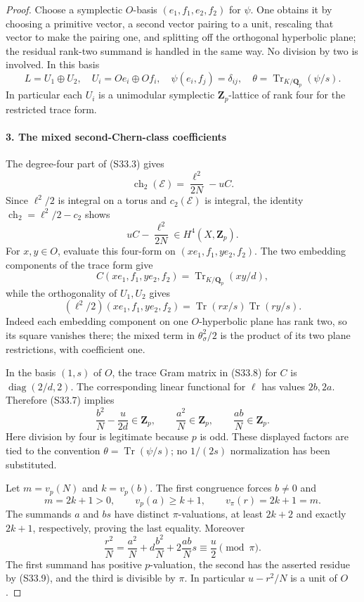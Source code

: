 \begin{proof}
Choose a symplectic \(O\)-basis \((e_1,f_1,e_2,f_2)\) for \(\psi\). One obtains it by choosing a primitive vector, a second vector pairing to a unit, rescaling that vector to make the pairing one, and splitting off the orthogonal hyperbolic plane; the residual rank-two summand is handled in the same way. No division by two is involved. In this basis \[
 L=U_1\oplus U_2,
 \quad U_i=Oe_i\oplus Of_i,
 \quad \psi(e_i,f_j)=\delta_{ij},
 \quad \theta=\operatorname{Tr}_{K/\mathbf Q_p}(\psi/s).
 \tag{S33.6}
\] In particular each \(U_i\) is a unimodular symplectic \(\mathbf Z_p\)-lattice of rank four for the restricted trace form.

\paragraph{3. The mixed second-Chern-class coefficients}

The degree-four part of (S33.3) gives \[
 \operatorname{ch}_2(\mathcal E)=\frac{\ell^2}{2N}-uC.
\] Since \(\ell^2/2\) is integral on a torus and \(c_2(\mathcal E)\) is integral, the identity \(\operatorname{ch}_2=\ell^2/2-c_2\) shows \[
 uC-\frac{\ell^2}{2N}\in H^4(X,\mathbf Z_p).
 \tag{S33.7}
\] For \(x,y\in O\), evaluate this four-form on \((xe_1,f_1,ye_2,f_2)\). The two embedding components of the trace form give \[
 C(xe_1,f_1,ye_2,f_2)=\operatorname{Tr}_{K/\mathbf Q_p}(xy/d),
\] while the orthogonality of \(U_1,U_2\) gives \[
 (\ell^2/2)(xe_1,f_1,ye_2,f_2)
 =\operatorname{Tr}(rx/s)\operatorname{Tr}(ry/s).
 \tag{S33.8}
\] Indeed each embedding component on one \(O\)-hyperbolic plane has rank two, so its square vanishes there; the mixed term in \(\theta_\sigma^2/2\) is the product of its two plane restrictions, with coefficient one.

In the basis \((1,s)\) of \(O\), the trace Gram matrix in (S33.8) for \(C\) is \(\operatorname{diag}(2/d,2)\). The corresponding linear functional for \(\ell\) has values \(2b,2a\). Therefore (S33.7) implies \[
 \frac{b^2}{N}-\frac{u}{2d}\in\mathbf Z_p,
 \qquad \frac{a^2}{N}\in\mathbf Z_p,
 \qquad \frac{ab}{N}\in\mathbf Z_p.
 \tag{S33.9}
\] Here division by four is legitimate because \(p\) is odd. These displayed factors are tied to the convention \(\theta=\operatorname{Tr}(\psi/s)\); no \(1/(2s)\) normalization has been substituted.

Let \(m=v_p(N)\) and \(k=v_p(b)\). The first congruence forces \(b\ne0\) and \[
 m=2k+1>0,
 \qquad v_p(a)\ge k+1,
 \qquad v_\pi(r)=2k+1=m.
 \tag{S33.10}
\] The summands \(a\) and \(bs\) have distinct \(\pi\)-valuations, at least \(2k+2\) and exactly \(2k+1\), respectively, proving the last equality. Moreover \[
 \frac{r^2}{N}
 =\frac{a^2}{N}+d\frac{b^2}{N}
             +2\frac{ab}{N}s
 \equiv\frac u2\pmod\pi.
 \tag{S33.11}
\] The first summand has positive \(p\)-valuation, the second has the asserted residue by (S33.9), and the third is divisible by \(\pi\). In particular \(u-r^2/N\) is a unit of \(O\).


\end{proof}
